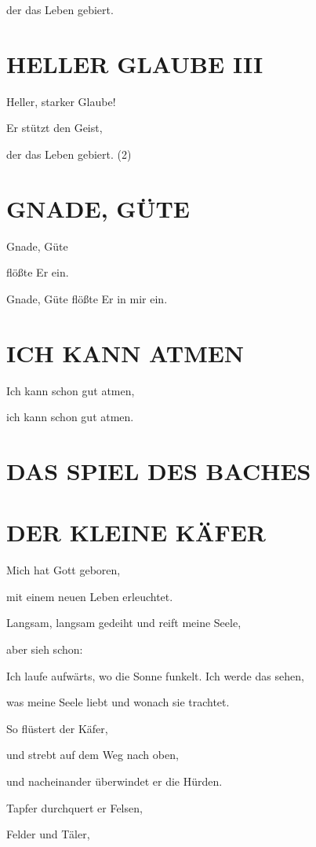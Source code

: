 \documentclass[11pt,a5paper,twoside]{article}
\begin{document}
der das Leben gebiert.


\section[Heller Glaube III]{HELLER GLAUBE III}

Heller, starker Glaube! 

Er stützt den Geist, 

der das Leben gebiert. (2)

\section[Gnade, Güte]{GNADE, GÜTE}

Gnade, Güte

flößte Er ein. 

Gnade, Güte flößte Er in mir ein.

\section[Ich kann atmen]{ICH KANN ATMEN}

Ich kann schon gut atmen, 

ich kann schon gut atmen.

\section[Das Spiel des Baches]{DAS SPIEL DES BACHES}

\section[Der kleine Käfer]{DER KLEINE KÄFER}

Mich hat Gott geboren,

mit einem neuen Leben erleuchtet.

Langsam, langsam gedeiht und reift meine Seele,

aber sieh schon:

Ich laufe aufwärts, wo die Sonne funkelt. Ich werde das sehen,

was meine Seele liebt und wonach sie trachtet.

So flüstert der Käfer,

und strebt auf dem Weg nach oben,

und nacheinander überwindet er die Hürden. 

Tapfer durchquert er Felsen, 

Felder und Täler,
\end{document}
